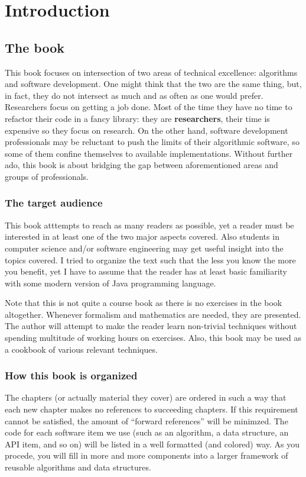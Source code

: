 \chapter{Introduction}

\section{The book}
This book focuses on intersection of two areas of technical excellence: algorithms and software development. One might think that the two are the same thing, but, in fact, they do not intersect as much and as often as one would prefer. Researchers focus on getting a job done. Most of the time they have no time to refactor their code in a fancy library: they are \textbf{researchers}, their time is expensive so they focus on research. On the other hand, software development professionals may be reluctant to push the limits of their algorithmic software, so some of them confine themselves to available implementations. Without further ado, this book is about bridging the gap between aforementioned areas and groups of professionals.

\subsection{The target audience}
This book atttempts to reach as many readers as possible, yet a reader must be interested in at least one of the two major aspects covered. Also students in computer science and/or software engineering may get useful insight into the topics covered. I tried to organize the text such that the less you know the more you benefit, yet I have to assume that the reader has at least basic familiarity with some modern version of Java programming language.

Note that this is not quite a course book as there is no exercises in the book altogether. Whenever formalism and mathematics are needed, they are presented. The author will attempt to make the reader learn non-trivial techniques without spending multitude of working hours on exercises. Also, this book may be used as a cookbook of various relevant techniques.

\subsection{How this book is organized}
The  chapters (or actually material they cover) are ordered in such a way that each new chapter makes no references to succeeding chapters. If this requirement cannot be satisfied, the amount of ``forward references'' will be minimzed. The code for each software item we use (such as an algorithm, a data structure, an API item, and so on) will be listed in a well formatted (and colored) way. As you procede, you will fill in more and more components into a larger framework of reusable algorithms and data structures.

